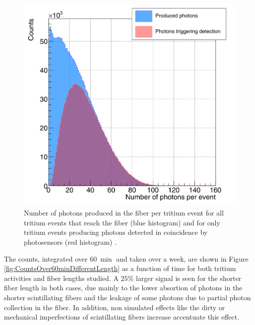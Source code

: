 \begin{figure}[h]
\centering
\includegraphics[scale=0.3]{Figures/8SimulationsResults/81TRITIUMDesign/813Length/CollectionPhotonsInFibers.png}
\caption{Number of photons produced in the fiber per tritium event for all tritium events that reach the fiber (blue histogram) and for only tritium events producing photons detected in coincidence by photosensors (red histogram) \cite{SimulationPaperCarlos}.\label{fig:PhotonsFibersYesNoPhotosensors}}
\end{figure}


The counts, integrated over $60~\min$ and taken over a week, are shown in Figure \ref{fig:CountsOver60minDifferentLength} as a function of time for both tritium activities and fiber lengths studied. A $25\%$ larger signal is seen for the shorter fiber length in both cases, due mainly to the lower absortion of photons in the shorter scintillating fibers and the leakage of some photons due to partial photon collection in the fiber. In addition, non simulated effects like the dirty or mechanical imperfections of scintillating fibers increase accentuate this effect.

